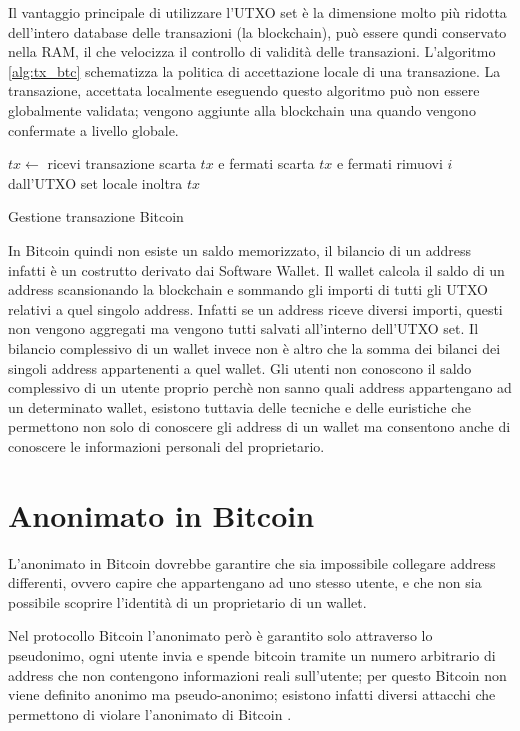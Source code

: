 Il vantaggio principale di utilizzare l'UTXO set è la dimensione molto più ridotta dell'intero database delle transazioni (la blockchain), può essere qundi conservato nella RAM, il che velocizza il controllo di validità delle transazioni. L'algoritmo \ref{alg:tx_btc} schematizza la politica di accettazione locale di una transazione. La transazione, accettata localmente eseguendo questo algoritmo può non essere globalmente validata; vengono aggiunte alla blockchain una quando vengono confermate a livello globale.
\begin{algorithm}
\begin{algorithmic}
\State $tx \gets$ ricevi transazione
        \State scarta $tx$ e fermati
    \EndIf
\EndFor
{}
    \State scarta $tx$ e fermati
\EndIf
{}
    \State rimuovi $i$ dall'UTXO set locale
\EndFor
\State inoltra $tx$
\end{algorithmic}
\caption{Gestione transazione Bitcoin}
\label{alg:tx_btc}
\end{algorithm}
\FloatBarrier
In Bitcoin quindi non esiste un saldo memorizzato, il bilancio di un address infatti è un costrutto derivato dai Software Wallet. Il wallet calcola il saldo di un address scansionando la blockchain e sommando gli importi di tutti gli UTXO relativi a quel singolo address. Infatti se un address riceve diversi importi, questi non vengono aggregati ma vengono tutti salvati all'interno dell'UTXO set. Il bilancio complessivo di un wallet invece non è altro che la somma dei bilanci dei singoli address appartenenti a quel wallet. 
Gli utenti non conoscono il saldo complessivo di un utente proprio perchè non sanno quali address appartengano ad un determinato wallet, esistono tuttavia delle tecniche e delle euristiche che permettono non solo di conoscere gli address di un wallet ma consentono anche di conoscere le informazioni personali del proprietario.
\section{Anonimato in Bitcoin}\label{Anonimato}
L'anonimato in Bitcoin dovrebbe garantire che sia impossibile collegare address differenti, ovvero capire che appartengano ad uno stesso utente, e che non sia possibile scoprire l'identità di un proprietario di un wallet.

Nel protocollo Bitcoin l'anonimato però è garantito solo attraverso lo pseudonimo, ogni utente invia e spende bitcoin tramite un numero arbitrario di address che non contengono informazioni reali sull'utente; per questo Bitcoin non viene definito anonimo ma pseudo-anonimo; esistono infatti diversi attacchi che permettono di violare l'anonimato di Bitcoin \cite{de-anonimizzazione} \cite{de-anon2}.

